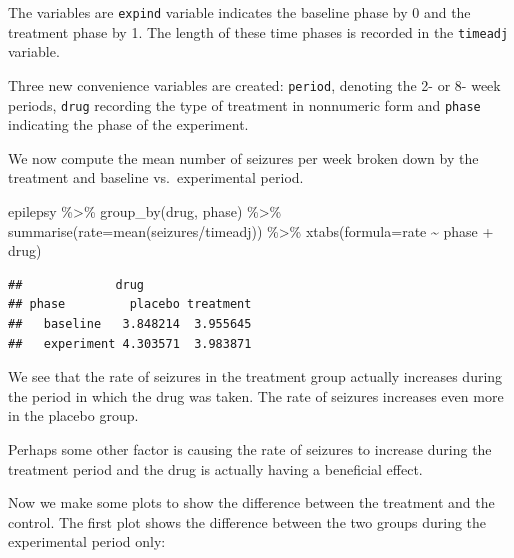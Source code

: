\documentclass[
  ignorenonframetext,
]{beamer}
\newenvironment{Shaded}{\begin{snugshade}}{\end{snugshade}}
\newcommand{\AttributeTok}[1]{\textcolor[rgb]{0.77,0.63,0.00}{#1}}
\newcommand{\FunctionTok}[1]{\textcolor[rgb]{0.00,0.00,0.00}{#1}}
\newcommand{\NormalTok}[1]{#1}
\newcommand{\SpecialCharTok}[1]{\textcolor[rgb]{0.00,0.00,0.00}{#1}}
\begin{document}
\begin{frame}[fragile]{}
\protect\hypertarget{section-2}{}
The variables are \texttt{expind} variable indicates the baseline phase
by 0 and the treatment phase by 1. The length of these time phases is
recorded in the \texttt{timeadj} variable.

Three new convenience variables are created: \texttt{period}, denoting
the 2- or 8- week periods, \texttt{drug} recording the type of treatment
in nonnumeric form and \texttt{phase} indicating the phase of the
experiment.

We now compute the mean number of seizures per week broken down by the
treatment and baseline vs.~experimental period.

\vspace{12pt}
\tiny

\begin{Shaded}
\begin{Highlighting}[]
\NormalTok{epilepsy }\SpecialCharTok{\%\textgreater{}\%} 
  \FunctionTok{group\_by}\NormalTok{(drug, phase) }\SpecialCharTok{\%\textgreater{}\%} 
  \FunctionTok{summarise}\NormalTok{(}\AttributeTok{rate=}\FunctionTok{mean}\NormalTok{(seizures}\SpecialCharTok{/}\NormalTok{timeadj)) }\SpecialCharTok{\%\textgreater{}\%}
\FunctionTok{xtabs}\NormalTok{(}\AttributeTok{formula=}\NormalTok{rate }\SpecialCharTok{\textasciitilde{}}\NormalTok{ phase }\SpecialCharTok{+}\NormalTok{ drug)}
\end{Highlighting}
\end{Shaded}

\begin{verbatim}
##             drug
## phase         placebo treatment
##   baseline   3.848214  3.955645
##   experiment 4.303571  3.983871
\end{verbatim}
\end{frame}

\begin{frame}{}
\protect\hypertarget{section-3}{}
We see that the rate of seizures in the treatment group actually
increases during the period in which the drug was taken. The rate of
seizures increases even more in the placebo group.

Perhaps some other factor is causing the rate of seizures to increase
during the treatment period and the drug is actually having a beneficial
effect.

Now we make some plots to show the difference between the treatment and
the control. The first plot shows the difference between the two groups
during the experimental period only:
\end{frame}
\end{document}
